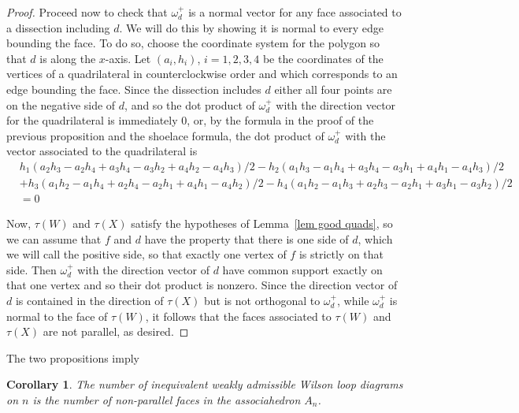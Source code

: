 \documentclass[11pt]{article}
\newcommand{\note}{\todo[color=green!40]}
\newtheorem{cor}[thm]{Corollary}
\theoremstyle{remark}
\theoremstyle{definition}
\begin{document}
\begin{proof}
    Proceed now to check that $\omega^+_d$ is a normal vector for any face associated to a dissection including $d$.  We will do this by showing it is normal to every edge bounding the face.  To do so, choose the coordinate system for the polygon so that $d$ is along the $x$-axis.  Let $(a_i, h_i)$, $i=1,2,3,4$ be the coordinates of the vertices of a quadrilateral in counterclockwise order and which corresponds to an edge bounding the face.  Since the dissection includes $d$ either all four points are on the negative side of $d$, and so the dot product of $\omega^+_d$ with the direction vector for the quadrilateral is immediately $0$, or, by the formula in the proof of the previous proposition and the shoelace formula, the dot product of $\omega^+_d$ with the vector associated to the quadrilateral is
    \begin{align*}
      & h_1(a_2h_3-a_2h_4+a_3h_4-a_3h_2+a_4h_2-a_4h_3)/2 - h_2(a_1h_3-a_1h_4+a_3h_4-a_3h_1+a_4h_1-a_4h_3)/2 \\
      & + h_3(a_1h_2-a_1h_4+a_2h_4-a_2h_1+a_4h_1-a_4h_2)/2 - h_4(a_1h_2-a_1h_3+a_2h_3-a_2h_1+a_3h_1-a_3h_2)/2 \\
      & = 0
    \end{align*}

    Now, $\tau(W)$ and $\tau(X)$ satisfy the hypotheses of Lemma~\ref{lem good quads}, so we can assume that $f$ and $d$ have the property that there is one side of $d$, which we will call the positive side, so that exactly one vertex of $f$ is strictly on that side.  Then $\omega^+_d$ with the direction vector of $d$ have common support exactly on that one vertex and so their dot product is nonzero.  Since the direction vector of $d$ is contained in the direction of $\tau(X)$ but is not orthogonal to $\omega^+_d$, while $\omega^+_d$ is normal to the face of $\tau(W)$, it follows that the faces associated to $\tau(W)$ and $\tau(X)$ are not parallel, as desired.
\end{proof}


The two propositions imply
\begin{cor}
  The number of inequivalent weakly admissible Wilson loop diagrams on $n$ is the number of non-parallel faces in the associahedron $A_n$.
\end{cor}

\note{Do we want a conclusion section?}

%
%
\end{document}
